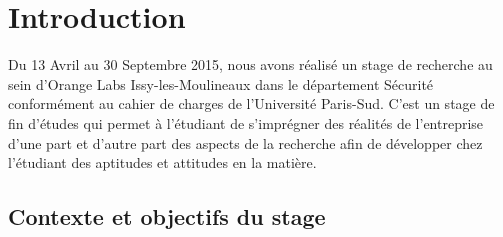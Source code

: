 \chapter{Introduction}  

Du 13 Avril au 30 Septembre 2015, nous avons réalisé un stage de recherche au sein d’Orange Labs Issy-les-Moulineaux dans le département  Sécurité conformément au cahier de charges de l’Université Paris-Sud. 
C’est un stage de fin d’études qui permet à l’étudiant de s’imprégner des réalités de l’entreprise d’une part et d’autre part des aspects de la recherche afin 
de développer chez l’étudiant des aptitudes et attitudes en la matière.              
 
\section{Contexte et objectifs du stage}
\label{sec:contexte}

